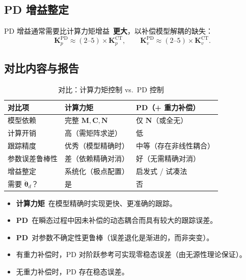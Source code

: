 \documentclass[12pt,a4paper]{ctexart}
\begin{document}
\subsection{PD 增益整定}

PD 增益通常需要比计算力矩增益\ \textbf{更大}，以补偿模型解耦的缺失：
\[
\mathbf{K}_p^{\text{PD}} \approx (2\text{--}5) \times \mathbf{K}_p^{\text{CT}},\qquad
\mathbf{K}_v^{\text{PD}} \approx (2\text{--}5) \times \mathbf{K}_v^{\text{CT}}.
\]

\subsection{对比内容与报告}

\begin{table}[H]
\centering
\caption{对比：计算力矩控制 vs.\ PD 控制}
\begin{tabular}{p{3.5cm}p{6cm}p{5cm}}
\toprule
\textbf{对比项} & \textbf{计算力矩} & \textbf{PD（+ 重力补偿）} \\
\midrule
模型依赖 & 完整 $\mathbf{M},\mathbf{C},\mathbf{N}$ & 仅 $\mathbf{N}$（或全无） \\
计算开销 & 高（需矩阵求逆） & 低 \\
跟踪精度 & 优秀（模型精确时） & 中等（存在非线性耦合） \\
参数误差鲁棒性 & 差（依赖精确对消） & 好（无需精确对消） \\
增益整定 & 系统化（极点配置） & 启发式 / 试凑法 \\
需要 $\ddot{\bm{\theta}}_d$？ & 是 & 否 \\
\bottomrule
\end{tabular}
\end{table}

\begin{resultbox}[预期结果]
\begin{itemize}
  \item \textbf{计算力矩}\ 在模型精确时实现更快、更准确的跟踪。
  \item \textbf{PD}\ 在瞬态过程中因未补偿的动态耦合而具有较大的跟踪误差。
  \item \textbf{PD}\ 对参数不确定性更鲁棒（误差退化是渐进的，而非突变）。
  \item 有重力补偿时，PD 对阶跃参考可实现零稳态误差（由无源性理论保证）。
  \item 无重力补偿时，PD 存在稳态误差。
\end{itemize}
\end{resultbox}

\end{document}
